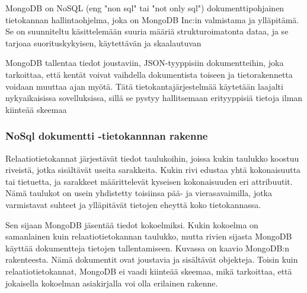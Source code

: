 












MongoDB on NoSQL (eng "non sql"{} tai "not only sql"{}) dokumenttipohjainen tietokannan hallintaohjelma,
joka on MongoDB Inc:in valmistama ja ylläpitämä.
Se on suunniteltu käsittelemään suuria määriä strukturoimatonta dataa,
ja se tarjoaa suorituskykyisen, käytettävän ja skaalautuvan
\medskip




MongoDB tallentaa tiedot joustaviin, JSON-tyyppisiin dokumentteihin, 
joka tarkoittaa, että kentät voivat vaihdella dokumentista toiseen ja tietorakennetta voidaan muuttaa ajan myötä. 
Tätä tietokantajärjestelmää käytetään laajalti nykyaikaisissa sovelluksissa, 
sillä se pystyy hallitsemaan erityyppisiä tietoja ilman kiinteää skeemaa
\medskip



\subsubsection{NoSql dokumentti -tietokannnan rakenne}




Relaatiotietokannat järjestävät tiedot taulukoihin,
joissa kukin taulukko koostuu riveistä, jotka sisältävät useita sarakkeita.
Kukin rivi edustaa yhtä kokonaisuutta tai tietuetta, ja sarakkeet määrittelevät kyseisen kokonaisuuden eri attribuutit.
Nämä taulukot on usein yhdistetty toisiinsa pää- ja vierasavaimilla,
jotka varmistavat suhteet ja ylläpitävät tietojen eheyttä koko tietokannassa.
\medskip

Sen sijaan MongoDB jäsentää tiedot kokoelmiksi.
Kukin kokoelma on samanlainen kuin relaatiotietokannan taulukko,
mutta rivien sijasta MongoDB käyttää dokumentteja tietojen tallentamiseen.
Kuvassa \nextImageCount{} on kaavio MongoDB:n rakenteesta. 
Nämä dokumentit ovat joustavia ja sisältävät objekteja.
Toisin kuin relaatiotietokannat, MongoDB ei vaadi kiinteää skeemaa, mikä tarkoittaa, 
että jokaisella kokoelman asiakirjalla voi olla erilainen rakenne.
\medskip

